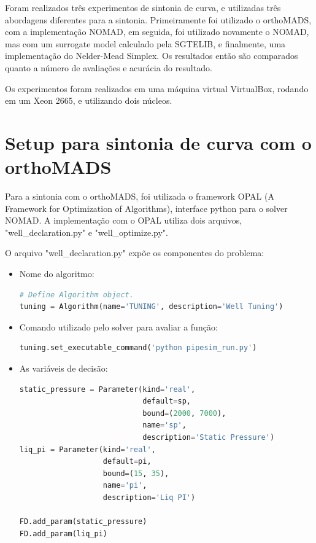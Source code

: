 Foram realizados três experimentos de sintonia de curva, e utilizadas três abordagens diferentes para a sintonia. Primeiramente foi utilizado o orthoMADS, com a implementação NOMAD, em seguida, foi utilizado novamente o NOMAD, mas com um surrogate model calculado pela SGTELIB, e finalmente, uma implementação do Nelder-Mead Simplex. Os resultados então são comparados quanto a número de avaliações e acurácia do resultado.

Os experimentos foram realizados em uma máquina virtual VirtualBox, rodando em um Xeon 2665, e utilizando dois núcleos.

\section{Setup para sintonia de curva com o orthoMADS}
Para a sintonia com o orthoMADS, foi utilizada o framework OPAL (A Framework for Optimization of Algorithms), interface python para o solver NOMAD.
A implementação com o OPAL utiliza dois arquivos, "well\_declaration.py" e "well\_optimize.py".

O arquivo "well\_declaration.py" expõe os componentes do problema:

\begin{itemize}
\item Nome do algoritmo:
\begin{lstlisting}[language=Python]
# Define Algorithm object.
tuning = Algorithm(name='TUNING', description='Well Tuning')
\end{lstlisting}
\end{itemize}

\begin{itemize}
\item Comando utilizado pelo solver para avaliar a função:
\begin{lstlisting}[language=Python]
tuning.set_executable_command('python pipesim_run.py')
\end{lstlisting}
\end{itemize}


\begin{itemize}
\item As variáveis de decisão:
\begin{lstlisting}[language=Python]
static_pressure = Parameter(kind='real', 
                            default=sp, 
                            bound=(2000, 7000),
                            name='sp', 
                            description='Static Pressure')
liq_pi = Parameter(kind='real', 
                   default=pi, 
                   bound=(15, 35),
                   name='pi', 
                   description='Liq PI')

FD.add_param(static_pressure)
FD.add_param(liq_pi)
\end{lstlisting}
\end{itemize}


